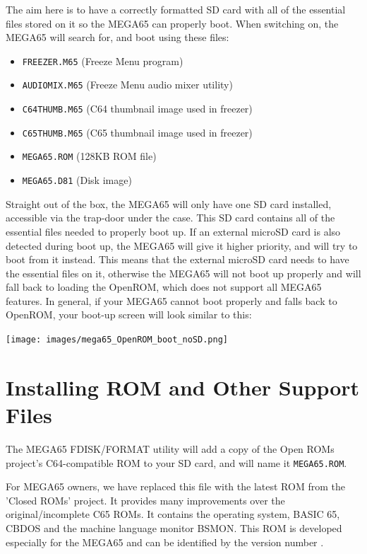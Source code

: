 The aim here is to have a correctly formatted SD card with all of the essential files stored on it so the MEGA65 can properly boot.
When switching on, the MEGA65 will search for, and boot using these files:
\begin{itemize}
\item {\tt FREEZER.M65} (Freeze Menu program)
\item {\tt AUDIOMIX.M65} (Freeze Menu audio mixer utility)
\item {\tt C64THUMB.M65} (C64 thumbnail image used in freezer)
\item {\tt C65THUMB.M65} (C65 thumbnail image used in freezer)
\item {\tt MEGA65.ROM}   (128KB ROM file)
\item {\tt MEGA65.D81} (Disk image)
\end{itemize}

Straight out of the box, the MEGA65 will only have one SD card installed, accessible via the trap-door under the case. This SD card contains all of the essential files needed to properly boot up.
If an external microSD card is also detected during boot up, the MEGA65 will give it higher priority, and will try to boot from it instead.
This means that the external microSD card needs to have the essential files on it, otherwise the MEGA65 will not boot up properly and will fall back to loading the OpenROM, which does not support all MEGA65 features.
In general, if your MEGA65 cannot boot properly and falls back to OpenROM, your boot-up screen will look similar to this:

\begin{center}
\texttt{[image: images/mega65\_OpenROM\_boot\_noSD.png]}
\end{center}


\section{Installing ROM and Other Support Files}
\label{sec:installingrometc}

The MEGA65 FDISK/FORMAT utility will add a copy of the Open ROMs project's C64-compatible ROM
to your SD card, and will name it {\tt MEGA65.ROM}.

For MEGA65 owners, we have replaced this file with the latest ROM from the 'Closed ROMs'
project. It provides many improvements over the original/incomplete C65 ROMs. It contains
the operating system, BASIC 65, CBDOS and the machine language monitor BSMON.
This ROM is developed especially for the MEGA65 and can be
identified by the version number .

